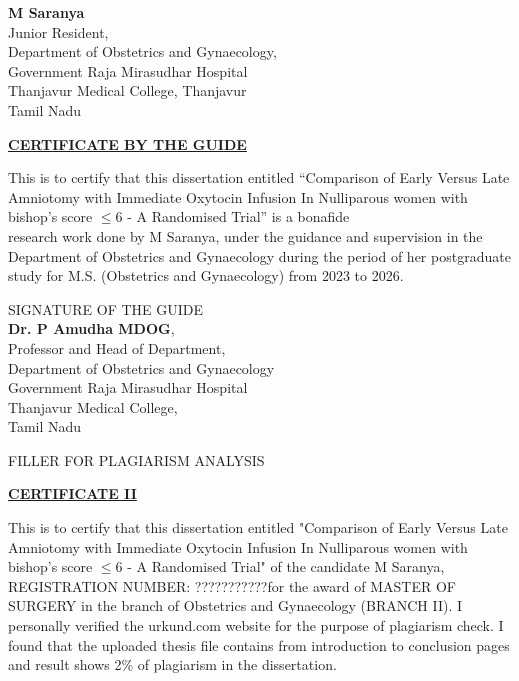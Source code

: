 \documentclass[14pt]{extarticle}
\def\name{M Saranya}
\def\study{Comparison of Early Versus Late Amniotomy with Immediate Oxytocin Infusion In Nulliparous women with bishop’s score $\leq$6 - A Randomised Trial}
\def\guide{Dr. P Amudha MDOG}
\def\guidedes{Professor and Head of Department}
\def\regno{???????????}
\begin{document}
\vspace{12mm}
\begin{flushright}
\textbf{\name} \\ Junior Resident, \\ Department of Obstetrics and Gynaecology, \\Government Raja Mirasudhar Hospital\\ Thanjavur Medical College, Thanjavur \\ Tamil Nadu 
\end{flushright}

\newpage

\null

\centerline{\underline{{\Large\textbf{CERTIFICATE BY THE GUIDE}}}}

\vspace{7mm}
This is to certify that this dissertation entitled {\small ``\study''} is a
bonafide \\ research work done by \name, under the guidance and supervision in
the Department of Obstetrics and Gynaecology during the period of her postgraduate study for M.S. (Obstetrics and Gynaecology) from 2023 to 2026.

\vspace{20mm}
\begin{flushright}
{\small SIGNATURE OF THE GUIDE\\[5pt]\textbf{\guide}, \\[5pt]\guidedes, \\ Department of
Obstetrics and Gynaecology \\ Government Raja Mirasudhar Hospital \\ Thanjavur Medical
College, \\ Tamil Nadu}
\end{flushright}


\newpage

FILLER FOR PLAGIARISM ANALYSIS

\newpage

\null

\centerline{\underline{{\Large\textbf{CERTIFICATE II}}}}

\vspace{7mm}
This is to certify that this dissertation entitled "\study" of the candidate
\name, REGISTRATION NUMBER: \regno for the award of MASTER OF SURGERY in the
branch of Obstetrics and Gynaecology (BRANCH II). I personally verified the
urkund.com website for the purpose of plagiarism check. I found that the
uploaded thesis file contains from introduction to conclusion pages and result
shows 2\% of plagiarism in the dissertation.
\end{document}
